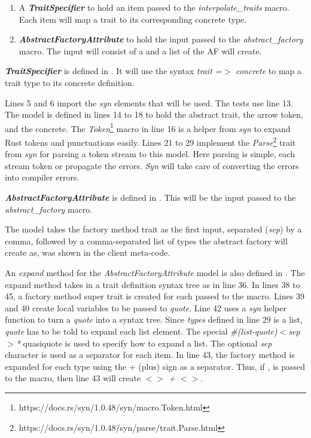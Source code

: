 \begin{enumerate}
	\item A \textbf{\textit{TraitSpecifier}} to hold an item passed to the \textit{interpolate\_traits} macro.
	      Each item will map a trait to its corresponding concrete type.
	\item \textbf{\textit{AbstractFactoryAttribute}} to hold the input passed to the \textit{abstract\_factory} macro.
	      The input will consist of a  and a list of  the AF will create.
\end{enumerate}

\textbf{\textit{TraitSpecifier}} is defined in .
It will use the syntax \textit{trait =$>$ concrete} to map a trait type to its concrete definition.

Lines 5 and 6 import the \textit{syn} elements that will be used.
The tests use line 13.
The model is defined in lines 14 to 18 to hold the abstract trait, the arrow token, and the concrete.
The \textit{Token}\footnote{https://docs.rs/syn/1.0.48/syn/macro.Token.html} macro in line 16 is a helper from \textit{syn} to expand Rust tokens and punctuations easily.
Lines 21 to 29 implement the \textit{Parse}\footnote{https://docs.rs/syn/1.0.48/syn/parse/trait.Parse.html} trait from \textit{syn} for parsing a token stream to this model.
Here parsing is simple,  each stream token or propagate the errors.
\textit{Syn} will take care of converting the errors into compiler errors.

\textbf{\textit{AbstractFactoryAttribute}} is defined in .
This will be the input passed to the \textit{abstract\_factory} macro.

The model takes the factory method trait as the first input, separated (\textit{sep}) by a comma, followed by a comma-separated list of types the abstract factory will create as, was shown in the client meta-code.

An \textit{expand} method for the \textit{AbstractFactoryAttribute} model is also defined in .
The expand method takes in a trait definition syntax tree as  in line 36.
In lines 38 to 45, a factory method super trait is created for each  passed to the macro.
Lines 39 and 40 create local variables to be passed to \textit{quote}.
Line 42 uses a \textit{syn} helper function to turn a \textit{quote} into a syntax tree.
Since \textit{types} defined in line 29 is a list, \textit{quote} has to be told to expand each list element.
The special \textit{\#(list-quote)$<$sep$>$*} quasiquote is used to specify how to expand a list.
The optional \textit{sep} character is used as a separator for each item.
In line 43, the factory method is expanded for each type using the + (plus) sign as a separator.
Thus, if \textit{, } is passed to the macro, then line 43 will create \textit{$<$$>$ + $<$$>$}.


